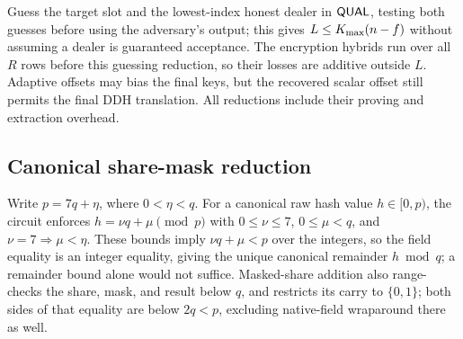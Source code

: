 Guess the target slot and the lowest-index honest dealer in $\mathsf{QUAL}$, testing both guesses before using the adversary's output; this gives $L\le K_{\max}(n-f)$ without assuming a dealer is guaranteed acceptance. The encryption hybrids run over all $R$ rows before this guessing reduction, so their losses are additive outside $L$. Adaptive offsets may bias the final keys, but the recovered scalar offset still permits the final DDH translation. All reductions include their proving and extraction overhead.

\subsection{Canonical share-mask reduction}
\label{app:mask}

Write $p=7q+\eta$, where $0<\eta<q$. For a canonical raw hash value $h\in[0,p)$, the circuit enforces $h=\nu q+\mu\pmod p$ with $0\le\nu\le7$, $0\le\mu<q$, and $\nu=7\Longrightarrow\mu<\eta$. These bounds imply $\nu q+\mu<p$ over the integers, so the field equality is an integer equality, giving the unique canonical remainder $h\bmod q$; a remainder bound alone would not suffice. Masked-share addition also range-checks the share, mask, and result below $q$, and restricts its carry to $\{0,1\}$; both sides of that equality are below $2q<p$, excluding native-field wraparound there as well.
